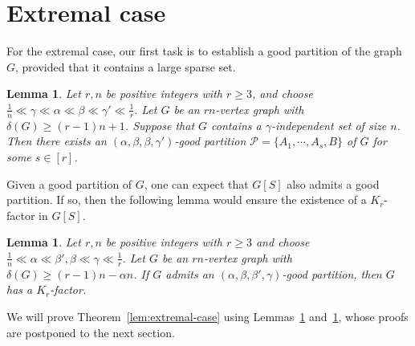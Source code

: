 \documentclass[11pt, a4paper]{article}
\newtheorem{lemma}[theorem]{Lemma}
\theoremstyle{definition}
\newcommand{\<}{\subseteq}
\newcommand{\de}{\delta}
\begin{document}
\section{Extremal case}\label{sec:extremal}

For the extremal case, our first task is to establish a good partition of the graph $G$, provided that it contains a large sparse set. 
\begin{lemma}\label{lem:construct good-partition}
    Let $r,n$ be positive integers with $r\ge 3$, and choose $\frac{1}{n}\ll \gamma\ll\alpha\ll\beta\ll\gamma'\ll \frac{1}{r}.$ {Let $G$ be an $rn$-vertex graph with $\delta(G)\geq (r-1)n+1$.} Suppose that $G$ contains a $\gamma$-independent set of size $n$. Then there exists an $(\alpha,\beta,\beta,\gamma')$-good partition $\mathcal{P}=\{A_1,\cdots,A_s,B\}$ of $G$ for some $s\in [r]$. %

\end{lemma}

Given a good partition of $G$, one can expect that $G[S]$ also admits a good partition. If so, then the following lemma would ensure the existence of a $K_r$-factor in $G[S]$.

\begin{lemma}\label{lem:covering bad vertices for balance}
Let $r,n$ be positive integers with $r\ge 3$ and choose $\frac{1}{n}\ll\alpha\ll\beta',  \beta\ll\gamma\ll \frac{1}{r}$. Let $G$ be an $rn$-vertex graph with {$\de(G)\geq (r-1)n-\alpha n$.}  %
If $G$ admits an $(\alpha,\beta,{\beta'},
\gamma)$-good partition, then $G$ has a $K_r$-factor. %
\end{lemma}
We will prove Theorem~\ref{lem:extremal-case} using Lemmas~\ref{lem:construct good-partition} and~\ref{lem:covering bad vertices for balance}, whose proofs are postponed to the next section.
\end{document}
